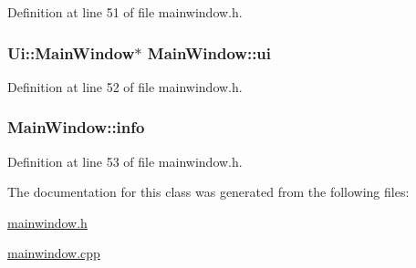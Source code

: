 Definition at line 51 of file mainwindow.\+h.

\hypertarget{class_main_window_a35466a70ed47252a0191168126a352a5}{
\subsubsection[{ui}]{\setlength{\rightskip}{0pt plus 5cm}Ui\+::\+Main\+Window$\ast$ Main\+Window\+::ui\hspace{0.3cm}{\ttfamily [private]}}}\label{class_main_window_a35466a70ed47252a0191168126a352a5}


Definition at line 52 of file mainwindow.\+h.

\hypertarget{class_main_window_a2d1f101eed410e692b5db9b7226174bf}{
\subsubsection[{info}]{ Main\+Window\+::info\hspace{0.3cm}{\ttfamily [private]}}}\label{class_main_window_a2d1f101eed410e692b5db9b7226174bf}


Definition at line 53 of file mainwindow.\+h.



The documentation for this class was generated from the following files\+:\begin{DoxyCompactItemize}
\item 
\hyperlink{mainwindow_8h}{mainwindow.\+h}\item 
\hyperlink{mainwindow_8cpp}{mainwindow.\+cpp}\end{DoxyCompactItemize}
